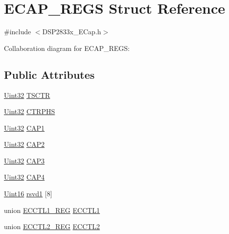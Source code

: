 \hypertarget{struct_e_c_a_p___r_e_g_s}{}\section{E\+C\+A\+P\+\_\+\+R\+E\+G\+S Struct Reference}
\label{struct_e_c_a_p___r_e_g_s}


{\ttfamily \#include $<$D\+S\+P2833x\+\_\+\+E\+Cap.\+h$>$}



Collaboration diagram for E\+C\+A\+P\+\_\+\+R\+E\+G\+S\+:
\subsection*{Public Attributes}
\begin{DoxyCompactItemize}
\item 
\hyperlink{_d_s_p2833x___device_8h_aba99025e657f892beb7ff31cecf64653}{Uint32} \hyperlink{struct_e_c_a_p___r_e_g_s_aaec359f7445364075ac3bc2120dc34de}{T\+S\+C\+T\+R}
\item 
\hyperlink{_d_s_p2833x___device_8h_aba99025e657f892beb7ff31cecf64653}{Uint32} \hyperlink{struct_e_c_a_p___r_e_g_s_a72fa3140be072978df30c73647d629b2}{C\+T\+R\+P\+H\+S}
\item 
\hyperlink{_d_s_p2833x___device_8h_aba99025e657f892beb7ff31cecf64653}{Uint32} \hyperlink{struct_e_c_a_p___r_e_g_s_a5a05dbca568a792018da16891acae3c8}{C\+A\+P1}
\item 
\hyperlink{_d_s_p2833x___device_8h_aba99025e657f892beb7ff31cecf64653}{Uint32} \hyperlink{struct_e_c_a_p___r_e_g_s_a3bebb090261767e32bbfa4a166d1f9bc}{C\+A\+P2}
\item 
\hyperlink{_d_s_p2833x___device_8h_aba99025e657f892beb7ff31cecf64653}{Uint32} \hyperlink{struct_e_c_a_p___r_e_g_s_a4c9775132229605a80476b5c02fce840}{C\+A\+P3}
\item 
\hyperlink{_d_s_p2833x___device_8h_aba99025e657f892beb7ff31cecf64653}{Uint32} \hyperlink{struct_e_c_a_p___r_e_g_s_a6aac307e836bc7028a35701e1e551203}{C\+A\+P4}
\item 
\hyperlink{_d_s_p2833x___device_8h_a59a9f6be4562c327cbfb4f7e8e18f08b}{Uint16} \hyperlink{struct_e_c_a_p___r_e_g_s_a37da0f873b57fe54332a26839355000b}{rsvd1} \mbox{[}8\mbox{]}
\item 
union \hyperlink{union_e_c_c_t_l1___r_e_g}{E\+C\+C\+T\+L1\+\_\+\+R\+E\+G} \hyperlink{struct_e_c_a_p___r_e_g_s_aa99878bb52d4091b5f68911435bf41ba}{E\+C\+C\+T\+L1}
\item 
union \hyperlink{union_e_c_c_t_l2___r_e_g}{E\+C\+C\+T\+L2\+\_\+\+R\+E\+G} \hyperlink{struct_e_c_a_p___r_e_g_s_a6796138ea8c100dcb295ab5f639b8f77}{E\+C\+C\+T\+L2}

\end{DoxyCompactItemize}
